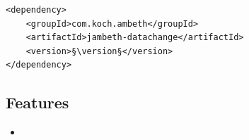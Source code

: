 \begin{lstlisting}[style=POM,caption={Maven modules to use \emph{Ambeth DataChange}}]
<dependency>
	<groupId>com.koch.ambeth</groupId>
	<artifactId>jambeth-datachange</artifactId>
	<version>§\version§</version>
</dependency>
\end{lstlisting}
\subsection{Features}
\begin{itemize}
	\item {}
\end{itemize}

